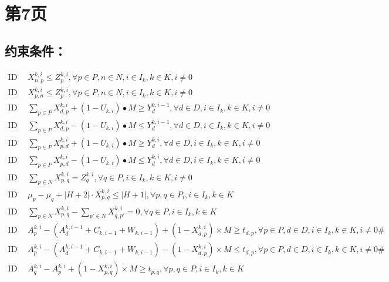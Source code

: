 \documentclass[11pt]{ctexart}
\begin{document}
\section*{第7页}

\subsection*{约束条件：}
\begin{align}
    \text{ID 26: } & X_{n,p}^{k,i} \leq Z_{p}^{k,i}, \forall p \in P, n \in N, i \in I_k, k \in K, i \neq 0 \tag{26} \\
    \text{ID 27: } & X_{p,n}^{k,i} \leq Z_{p}^{k,i}, \forall p \in P, n \in N, i \in I_k, k \in K, i \neq 0 \tag{27} \\
    \text{ID 28: } & \sum_{p \in P} X_{d,p}^{k,i} + (1 - U_{k,i}) \bullet M \geq Y_{d}^{k,i-1}, \forall d \in D, i \in I_k, k \in K, i \neq 0 \tag{28} \\
    \text{ID 29: } & \sum_{p \in P} X_{d,p}^{k,i} - (1 - U_{k,i}) \bullet M \leq Y_{d}^{k,i-1}, \forall d \in D, i \in I_k, k \in K, i \neq 0 \tag{29} \\
    \text{ID 30: } & \sum_{p \in P} X_{p,d}^{k,i} + (1 - U_{k,i}) \bullet M \geq Y_{d}^{k,i}, \forall d \in D, i \in I_k, k \in K, i \neq 0 \tag{30} \\
    \text{ID 31: } & \sum_{p \in P} X_{p,d}^{k,i} - (1 - U_{k,i}) \bullet M \leq Y_{d}^{k,i}, \forall d \in D, i \in I_k, k \in K, i \neq 0 \tag{31} \\
    \text{ID 32: } & \sum_{p \in N} X_{p,q}^{k,i} = Z_{q}^{k,i}, \forall q \in P, i \in I_k, k \in K, i \neq 0 \tag{32} \\
    \text{ID 33: } & \mu_p - \mu_q + |H + 2| \cdot X_{p,q}^{k,i} \leq |H + 1| , \forall p, q \in P_i, i \in I_k, k \in K \tag{33} \\
    \text{ID 34: } & \sum_{p \in N} X_{p,q}^{k,i} - \sum_{p' \in N} X_{q,p'}^{k,i} = 0, \forall q \in P, i \in I_k, k \in K \tag{34} \\
    \text{ID 35: } & A_p^{k,i} - (A_d^{k,i-1} + C_{k,i-1} + W_{k,i-1}) + \left(1 - X_{d,p}^{k,i}\right) \times M \geq t_{d,p}, \forall p \in P, d \in D, i \in I_k, k \in K, i \neq 0\# \tag{35} \\
    \text{ID 36: } & A_p^{k,i} - (A_d^{k,i-1} + C_{k,i-1} + W_{k,i-1}) - \left(1 - X_{d,p}^{k,i}\right) \times M \leq t_{d,p}, \forall p \in P, d \in D, i \in I_k, k \in K, i \neq 0\# \tag{36} \\
    \text{ID 37: } & A_q^{k,i} - A_p^{k,i} + \left(1 - X_{p,q}^{k,i}\right) \times M \geq t_{p,q}, \forall p, q \in P, i \in I_k, k \in K \tag{37} \\

\end{align}
\end{document}
